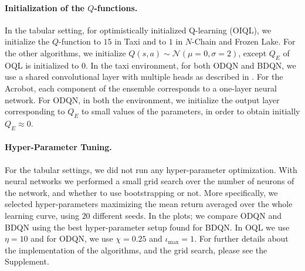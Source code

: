 \paragraph{Initialization of the $Q$-functions.} In the tabular setting, for optimistically initialized Q-learning (OIQL), we initialize the $Q$-function to $15$ in Taxi and to $1$ in $N$-Chain and Frozen Lake. For the other algorithms, we initialize $Q(s,a) \sim \mathcal{N}(\mu=0,\sigma=2)$, except $Q_E$ of OQL is initialized to $0$.
In the taxi environment, for both ODQN and BDQN, we use a shared convolutional layer with multiple heads as described in \cite{osband2016deep}. For the Acrobot, each component of the ensemble corresponds to a one-layer neural network. For ODQN, in both the environment, we initialize the output layer corresponding to $Q_E$ to small values of the parameters, in order to obtain initially $Q_E \approx 0$. 


\paragraph{Hyper-Parameter Tuning.} For the tabular settings, we did not run any hyper-parameter optimization. With neural networks we performed a small grid search over the number of neurons of the network, and whether to use bootstrapping or not. More specifically, we selected hyper-parameters maximizing the mean return averaged over the whole learning curve, using $20$ different seeds. In the plots; we compare ODQN and BDQN using the best hyper-parameter setup found for BDQN. In OQL we use $\eta=10$ and for ODQN, we use $\chi=0.25$ and $\iota_{\max}=1$. For further details about the implementation of the algorithms, and the grid search, please see the Supplement.


